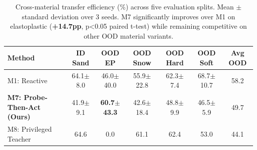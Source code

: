 \begin{table}[t]
\centering
\caption{Cross-material transfer efficiency (\%) across five evaluation splits. Mean $\pm$ standard deviation over 3 seeds. M7 significantly improves over M1 on elastoplastic (\textbf{+14.7pp}, p<0.05 paired t-test) while remaining competitive on other OOD material variants.}
\label{tab:main_results}
\begin{tabular}{lcccccc}
\toprule
Method & ID Sand & OOD EP & OOD Snow & OOD Hard & OOD Soft & Avg OOD \\
\midrule
M1: Reactive & 64.1$\pm$8.0 & 46.0$\pm$40.0 & 55.9$\pm$22.8 & 62.3$\pm$7.4 & 68.7$\pm$10.7 & 58.2 \\
\textbf{M7: Probe-Then-Act (Ours)} & 41.9$\pm$9.1 & \textbf{60.7$\pm$43.3} & 42.6$\pm$18.4 & 48.8$\pm$9.9 & 46.5$\pm$5.9 & 49.7 \\
M8: Privileged Teacher & 64.6 & 0.0 & 61.1 & 62.4 & 53.0 & 44.1 \\
\bottomrule
\end{tabular}
\end{table}
